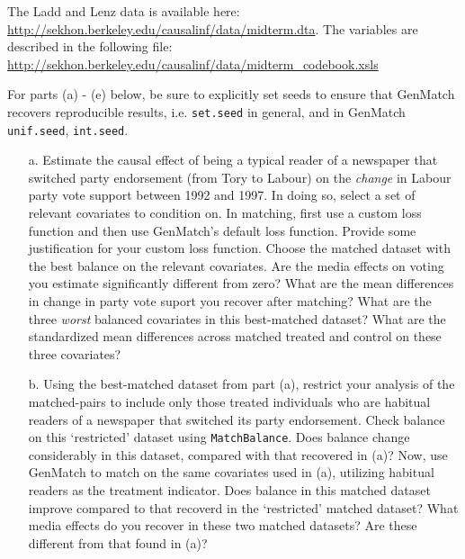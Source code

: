 \documentclass{article}
\begin{document}
\noindent The Ladd and Lenz data is available here:
\url{http://sekhon.berkeley.edu/causalinf/data/midterm.dta}.
The variables are described in the following file:
\url{http://sekhon.berkeley.edu/causalinf/data/midterm_codebook.xsls}


\vspace{1em}
\noindent For parts (a) - (e) below, be sure to explicitly set seeds
to ensure that GenMatch recovers reproducible results,
i.e. \texttt{set.seed} in general, and in GenMatch \texttt{unif.seed}, \texttt{int.seed}.

\begin{itemize}
\item[a.]  Estimate the causal effect of being a typical reader of a newspaper
  that switched party endorsement (from Tory to Labour) on the {\em
    change} in Labour party vote support between 1992 and 1997.  In
  doing so, select a set of relevant covariates to condition on.  In
  matching, first use a custom loss function and then use GenMatch’s
  default loss function. Provide some justification for your custom
  loss function. Choose the matched dataset with the best balance on
  the relevant covariates.  Are the media effects on voting you
  estimate significantly different from zero? What are the mean
  differences in change in party vote suport you recover after
  matching?  What are the three {\em worst} balanced covariates in
  this best-matched dataset?  What are the standardized mean
  differences across matched treated and control on these three
  covariates?


\item[b.] Using the best-matched dataset from part (a), restrict your
  analysis of the matched-pairs to include only those treated
  individuals who are habitual readers of a newspaper that switched
  its party endorsement.  Check balance on this `restricted' dataset
  using \texttt{MatchBalance}.  Does balance change considerably in
  this dataset, compared with that recovered in (a)?  Now, use
  GenMatch to match on the same covariates used in (a), utilizing
  habitual readers as the treatment indicator.  Does balance in this
  matched dataset improve compared to that recoverd in the
  `restricted' matched dataset?  What media effects do you recover in these
  two matched datasets?  Are these different from that found in (a)?


\end{itemize}
\end{document}
